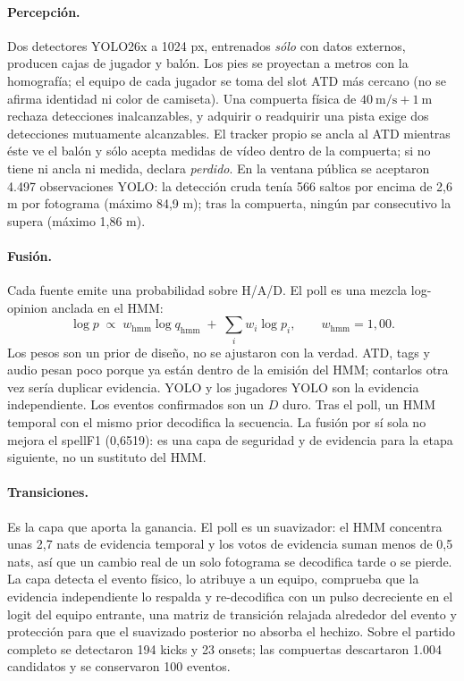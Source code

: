 \documentclass[10pt,a4paper]{article}
\begin{document}
\paragraph{Percepción.} Dos detectores YOLO26x a 1024 px, entrenados \emph{sólo} con datos
externos, producen cajas de jugador y balón. Los pies se proyectan a metros con la homografía;
el equipo de cada jugador se toma del slot ATD más cercano (no se afirma identidad ni color de
camiseta). Una compuerta física de $40\ \mathrm{m/s}+1\ \mathrm{m}$ rechaza detecciones
inalcanzables, y adquirir o readquirir una pista exige dos detecciones mutuamente alcanzables. El
tracker propio se ancla al ATD mientras éste ve el balón y sólo acepta medidas de vídeo dentro de
la compuerta; si no tiene ni ancla ni medida, declara \emph{perdido}. En la ventana pública se
aceptaron 4.497 observaciones YOLO: la detección cruda tenía 566 saltos por encima de 2,6 m por
fotograma (máximo 84,9 m); tras la compuerta, ningún par consecutivo la supera (máximo 1,86 m).

\paragraph{Fusión.} Cada fuente emite una probabilidad sobre H/A/D. El poll es una mezcla
log-opinion anclada en el HMM:
\begin{equation}
\log p \;\propto\; w_{\mathrm{hmm}}\log q_{\mathrm{hmm}}
\;+\;\sum_i w_i \log p_i,
\qquad w_{\mathrm{hmm}}=1{,}00 .
\label{eq:pool}
\end{equation}
Los pesos son un prior de diseño, no se ajustaron con la verdad. ATD, tags y audio pesan poco
porque ya están dentro de la emisión del HMM; contarlos otra vez sería duplicar evidencia. YOLO y
los jugadores YOLO son la evidencia independiente. Los eventos confirmados son un $D$ duro. Tras
el poll, un HMM temporal con el mismo prior decodifica la secuencia. La fusión por sí sola no
mejora el spellF1 (0,6519): es una capa de seguridad y de evidencia para la etapa siguiente, no
un sustituto del HMM.

\paragraph{Transiciones.} Es la capa que aporta la ganancia. El poll es un suavizador: el HMM
concentra unas 2,7 nats de evidencia temporal y los votos de evidencia suman menos de 0,5 nats,
así que un cambio real de un solo fotograma se decodifica tarde o se pierde. La capa detecta
el evento físico, lo atribuye a un equipo, comprueba que la evidencia independiente lo respalda y
re-decodifica con un pulso decreciente en el logit del equipo entrante, una matriz de transición
relajada alrededor del evento y protección para que el suavizado posterior no absorba el hechizo.
Sobre el partido completo se detectaron 194 kicks y 23 onsets; las compuertas descartaron 1.004
candidatos y se conservaron 100 eventos.
\end{document}
